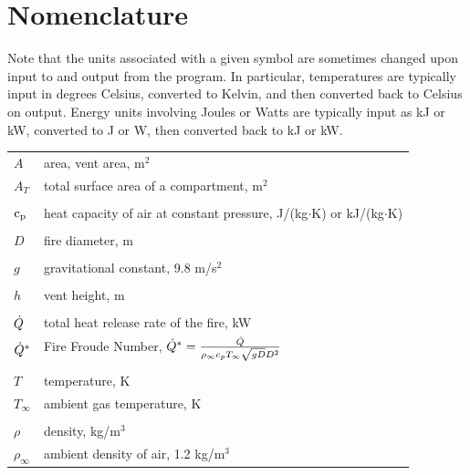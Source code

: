 \documentclass[12pt,twoside]{book}
\begin{document}
\printbibliography[heading=bibintoc,title={References}]

\appendix
{}

%
%

\chapter{Nomenclature}
\label{nomenclature}

Note that the units associated with a given symbol are sometimes changed upon input to and output from the program. In particular, temperatures are typically input in degrees Celsius, converted to Kelvin, and then converted back to Celsius on output. Energy units involving Joules or Watts are typically input as kJ or kW, converted to J or W, then converted back to kJ or kW.

\begin{center}
\begin{longtable}{p{1in}  p{5.5 in}}

$A$                 & area, vent area, m$^2$ \\
$A_T$               & total surface area of a compartment, m$^2$ \\ \\
${\mathrm{c}}\sb{\mathrm{p}}$               & heat capacity of air at constant pressure, J/(kg$\cdot$K) or kJ/(kg$\cdot$K) \\ \\
$D$                 & fire diameter, m \\ \\
$g$                 & gravitational constant, 9.8 m/s$^2$ \\ \\
$h$                 & vent height, m \\ \\
$\dot{Q}$               & total heat release rate of the fire, kW \\
$\dot{Q}^*$             & Fire Froude Number,  $\dot{Q}^* = \frac{\dot{Q}}{\rho_\infty c_p T_\infty \sqrt{gD} D^2}$ \\ \\
$T$                 & temperature, K \\
$T_\infty$          & ambient gas temperature, K \\ \\
$\rho$              & density, kg/m$^3$ \\
$\rho_\infty$       & ambient density of air, 1.2 kg/m$^3$ \\
\end{longtable}

\end{center}






\label{last_page}
\end{document}
